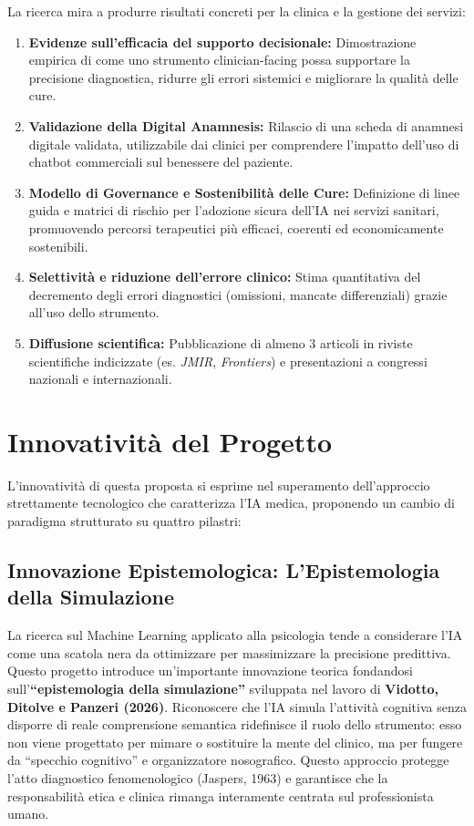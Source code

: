 \documentclass[11pt,a4paper]{article}
\begin{document}
La ricerca mira a produrre risultati concreti per la clinica e la gestione dei servizi:
\begin{enumerate}
    \item \textbf{Evidenze sull'efficacia del supporto decisionale:} Dimostrazione empirica di come uno strumento clinician-facing possa supportare la precisione diagnostica, ridurre gli errori sistemici e migliorare la qualità delle cure.
    \item \textbf{Validazione della Digital Anamnesis:} Rilascio di una scheda di anamnesi digitale validata, utilizzabile dai clinici per comprendere l'impatto dell'uso di chatbot commerciali sul benessere del paziente.
    \item \textbf{Modello di Governance e Sostenibilità delle Cure:} Definizione di linee guida e matrici di rischio per l'adozione sicura dell'IA nei servizi sanitari, promuovendo percorsi terapeutici più efficaci, coerenti ed economicamente sostenibili.
    \item \textbf{Selettività e riduzione dell'errore clinico:} Stima quantitativa del decremento degli errori diagnostici (omissioni, mancate differenziali) grazie all'uso dello strumento.
    \item \textbf{Diffusione scientifica:} Pubblicazione di almeno 3 articoli in riviste scientifiche indicizzate (es. \textit{JMIR}, \textit{Frontiers}) e presentazioni a congressi nazionali e internazionali.
\end{enumerate}

\section{Innovatività del Progetto}

L'innovatività di questa proposta si esprime nel superamento dell'approccio strettamente tecnologico che caratterizza l'IA medica, proponendo un cambio di paradigma strutturato su quattro pilastri:

\subsection{Innovazione Epistemologica: L'Epistemologia della Simulazione}
La ricerca sul Machine Learning applicato alla psicologia tende a considerare l'IA come una scatola nera da ottimizzare per massimizzare la precisione predittiva. Questo progetto introduce un'importante innovazione teorica fondandosi sull'\textbf{``epistemologia della simulazione''} sviluppata nel lavoro di \textbf{Vidotto, Ditolve e Panzeri (2026)}. Riconoscere che l'IA simula l'attività cognitiva senza disporre di reale comprensione semantica ridefinisce il ruolo dello strumento: esso non viene progettato per mimare o sostituire la mente del clinico, ma per fungere da ``specchio cognitivo'' e organizzatore nosografico. Questo approccio protegge l'atto diagnostico fenomenologico (Jaspers, 1963) e garantisce che la responsabilità etica e clinica rimanga interamente centrata sul professionista umano.
\end{document}
